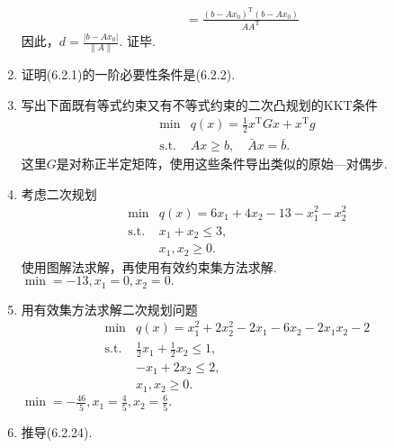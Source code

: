 \begin{enumerate}
\begin{align*}
        & = \frac{(b-Ax_0)^\mathrm{T}(b-Ax_0)}{AA^\mathrm{T}}
    \end{align*}
    因此，$\displaystyle d=\frac{|b-Ax_0|}{\|A\|}$. 证毕.
    \item 证明(6.2.1)的一阶必要性条件是(6.2.2).\\
    \omitted
    \item 写出下面既有等式约束又有不等式约束的二次凸规划的KKT条件
    \[\begin{array}{lll}
        \min & \displaystyle q(x)=\frac{1}{2}x^\mathrm{T}Gx+x^\mathrm{T}g\\
        \mathrm{s.t.} & Ax \geqslant b,\quad \bar{A}x=\bar{b}.
    \end{array}\]
    这里$G$是对称正半定矩阵，使用这些条件导出类似的原始—对偶步.\\
    \omitted
    \item 考虑二次规划
    \[\begin{array}{lll}
        \min & q(x)=6x_1+4x_2-13-x_1^2-x_2^2\\
        \mathrm{s.t.} & x_1+x_2 \leqslant 3,\\
        & x_1,x_2 \geqslant 0.
    \end{array}\]
    使用图解法求解，再使用有效约束集方法求解.\\
    \sol $\displaystyle \min=-13,x_1=0,x_2=0.$
    \item 用有效集方法求解二次规划问题
    \[\begin{array}{lll}
        \min & q(x)=x_1^2+2x_2^2-2x_1-6x_2-2x_1x_2-2\\
        \mathrm{s.t.} & \displaystyle \frac{1}{2}x_1+\frac{1}{2}x_2 \leqslant 1,\\
        & -x_1+2x_2 \leqslant 2,\\
        & x_1,x_2 \geqslant 0.
    \end{array}\]
    \sol $\displaystyle \min=-\frac{46}{5},x_1=\frac{4}{5},x_2=\frac{6}{5}.$
    \item 推导(6.2.24).\\
    \omitted
\end{enumerate}
\clearpage